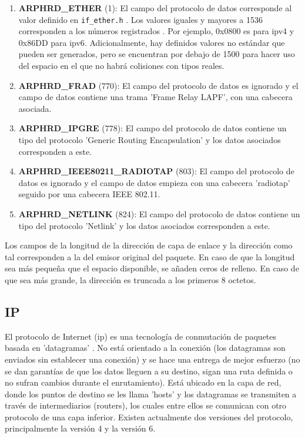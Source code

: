 \begin{enumerate}
    \item \textbf{ARPHRD\_ETHER} (1): El campo del protocolo de datos corresponde al valor definido en \texttt{if\_ether.h} \cite{linuxifether}. Los valores iguales y mayores a 1536 corresponden a los números registrados \cite{etherprotocolnumbers}. Por ejemplo, 0x0800 es para \acrshort{ipv4} y 0x86DD para \acrshort{ipv6}. Adicionalmente, hay definidos valores no estándar que pueden ser generados, pero se encuentran por debajo de 1500 para hacer uso del espacio en el que no habrá colisiones con tipos reales.
    \item \textbf{ARPHRD\_FRAD} (770): El campo del protocolo de datos es ignorado y el campo de datos contiene una trama 'Frame Relay LAPF', con una cabecera asociada. 
    \item \textbf{ARPHRD\_IPGRE} (778): El campo del protocolo de datos contiene un tipo del protocolo 'Generic Routing Encapsulation' y los datos asociados corresponden a este.
    \item \textbf{ARPHRD\_IEEE80211\_RADIOTAP} (803): El campo del protocolo de datos es ignorado y el campo de datos empieza con una cabecera 'radiotap' seguido por una cabecera IEEE 802.11.
    \item \textbf{ARPHRD\_NETLINK} (824): El campo del protocolo de datos contiene un tipo del protocolo 'Netlink' y los datos asociados corresponden a este.
\end{enumerate}

Los campos de la longitud de la dirección de capa de enlace y la dirección como tal corresponden a la del emisor original del paquete. En caso de que la longitud sea más pequeña que el espacio disponible, se añaden ceros de relleno. En caso de que sea más grande, la dirección es truncada a los primeros 8 octetos.

\subsection{IP} \label{ipformat}

El protocolo de Internet (\acrshort{ip}) es una tecnología de conmutación de paquetes basada en 'datagramas' \cite{iptechslides}. No está orientado a la conexión (los datagramas son enviados sin establecer una conexión) y se hace una entrega de mejor esfuerzo (no se dan garantías de que los datos lleguen a su destino, sigan una ruta definida o no sufran cambios durante el enrutamiento). Está ubicado en la capa de red, donde los puntos de destino se les llama 'hosts' y los datagramas se transmiten a través de intermediarios (routers), los cuales entre ellos se comunican con otro protocolo de una capa inferior. Existen actualmente dos versiones del protocolo, principalmente la versión 4 y la versión 6.

